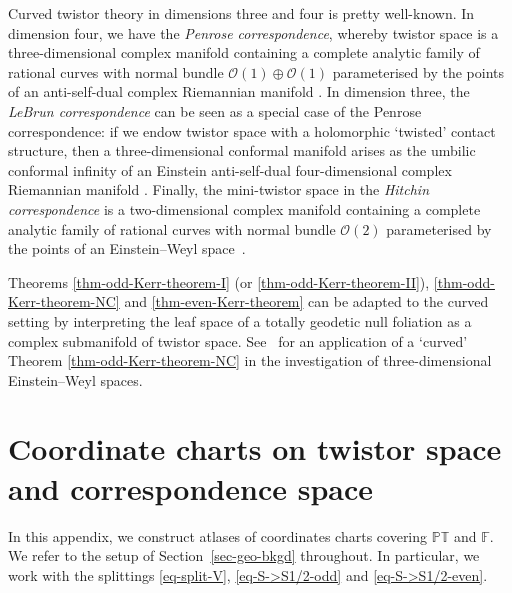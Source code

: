 \documentclass[10pt,a4paper]{amsart}
\numberwithin{equation}{section}
\newcommand{\mc} [1]{\mathcal{#1}}
\newcommand{\PT} {\mathbb{PT}}
\newcommand{\F} {\mathbb{F}}
\begin{document}
Curved twistor theory in dimensions three and four is pretty well-known. In dimension four, we have the \emph{Penrose correspondence}, whereby twistor space is a three-dimensional complex manifold containing a complete analytic family of rational curves with normal bundle $\mc{O}(1)\oplus \mc{O}(1)$ parameterised by the points of an anti-self-dual complex Riemannian manifold \cite{Penrose1976}. In dimension three, the \emph{LeBrun correspondence} can be seen as a special case of the Penrose correspondence: if we endow twistor space with a holomorphic `twisted' contact structure, then a three-dimensional conformal manifold arises as the umbilic conformal inf\/inity of an Einstein anti-self-dual four-dimensional complex Riemannian manifold \cite{LeBrun1982}. Finally, the mini-twistor space in the \emph{Hitchin correspondence} is a two-dimensional complex manifold containing a complete analytic family of rational curves with normal bundle $\mc{O}(2)$ parameterised by the points of an Einstein--Weyl space~\mbox{\cite{Hitchin1982a,Jones1985}}.

Theorems \ref{thm-odd-Kerr-theorem-I} (or \ref{thm-odd-Kerr-theorem-II}), \ref{thm-odd-Kerr-theorem-NC} and \ref{thm-even-Kerr-theorem} can be adapted to the curved setting by interpreting the leaf space of a totally geodetic null foliation as a complex submanifold of twistor space. See~\cite{Calderbank2000} for an application of a `curved' Theorem \ref{thm-odd-Kerr-theorem-NC} in the investigation of three-dimensional Einstein--Weyl spaces.

\appendix
\section{Coordinate charts on twistor space and correspondence space}\label{app-cover}
In this appendix, we construct atlases of coordinates charts covering $\PT$ and $\F$. We refer to the setup of Section~\ref{sec-geo-bkgd} throughout. In particular, we work with the splittings \eqref{eq-split-V}, \eqref{eq-S->S1/2-odd} and \eqref{eq-S->S1/2-even}.
\end{document}
